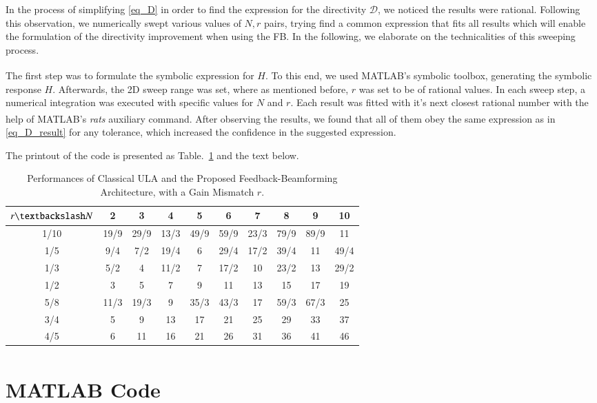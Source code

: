 In the process of simplifying \eqref{eq_D} in order to find the expression for the directivity $\mathcal{D}$, we noticed the results were rational.
Following this observation, we numerically swept various values of $N,r$ pairs, trying find a common expression that fits all results which will enable the formulation of the directivity improvement when using the FB.
In the following, we elaborate on the technicalities of this sweeping process.
\par The first step was to formulate the symbolic expression for $H$.
To this end, we used MATLAB\textsuperscript{\textregistered}'s symbolic toolbox, generating the symbolic response $H$.
Afterwards, the 2D sweep range was set, where as mentioned before, $r$ was set to be of rational values.
In each sweep step, a numerical integration was executed with specific values for $N$ and $r$.
Each result was fitted with it's next closest rational number with the help of MATLAB\textsuperscript{\textregistered}'s \emph{rats} auxiliary command.
After observing the results, we found that all of them obey the same expression as in \eqref{eq_D_result} for any tolerance, which increased the confidence in the suggested expression.
\par The printout of the code is presented as Table.~\ref{table_D} and the text below.
\begin{table}[h!]
    \caption{Performances of Classical ULA and the Proposed Feedback-Beamforming Architecture, with a Gain Mismatch $r$.}
    \centering
    {
        \begin{tabular}{||c c c c c c c c c c||}
            \hline
            $r \textbackslash N$ & 2 & 3 & 4 & 5 & 6 & 7 & 8 & 9 & 10 \\ [0.5ex] 
            \hline\hline
            1/10     & 19/9  & 29/9  & 13/3  & 49/9  & 59/9  & 23/3  & 79/9  & 89/9  & 11   \\ [1ex] 
            1/5      & 9/4   & 7/2   & 19/4  & 6     & 29/4  & 17/2  & 39/4  & 11    & 49/4 \\ [1ex] 
            1/3      & 5/2   & 4     & 11/2  & 7     & 17/2  & 10    & 23/2  & 13    & 29/2 \\ [1ex] 
            1/2      & 3     & 5     & 7     & 9     & 11    & 13    & 15    & 17    & 19   \\ [1ex] 
            5/8      & 11/3  & 19/3  & 9     & 35/3  & 43/3  & 17    & 59/3  & 67/3  & 25   \\ [1ex] 
            3/4      & 5     & 9     & 13    & 17    & 21    & 25    & 29    & 33    & 37   \\ [1ex] 
            4/5      & 6     & 11    & 16    & 21    & 26    & 31    & 36    & 41    & 46   \\ [1ex] 
            \hline
         \end{tabular}
     }
    \label{table_D}
\end{table}
\section*{MATLAB\textsuperscript{\textregistered} Code}


